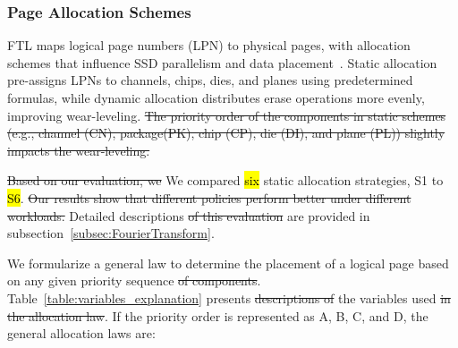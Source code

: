 \documentclass{ieeeaccess}
\begin{document}
\subsubsection{Page Allocation Schemes}

FTL maps logical page numbers (LPN) to physical pages, with allocation schemes that influence SSD parallelism and data placement~\cite{allocation-strategy-ics11, pagealloc-hotstorage12}. Static allocation pre-assigns LPNs to channels, chips, dies, and planes using predetermined formulas, while dynamic allocation distributes erase operations more evenly, improving wear-leveling. \sout{The priority order of the components in static schemes (e.g., channel (CN), package(PK), chip (CP), die (DI), and plane (PL)) slightly impacts the wear-leveling.}

\sout{Based on our evaluation, we} We compared \hl{six} static allocation strategies, S1 to \hl{S6}. \sout{Our results show that different policies perform better under different workloads.} Detailed descriptions \sout{of this evaluation} are provided in subsection~\ref{subsec:FourierTransform}.

We formularize a general law to determine the placement of a logical page based on any given priority sequence \sout{of components}. Table~\ref{table:variables_explanation} presents \sout{descriptions of} the variables used \sout{in the allocation law}. If the priority order is represented as A, B, C, and D, the general allocation laws are:
\end{document}
